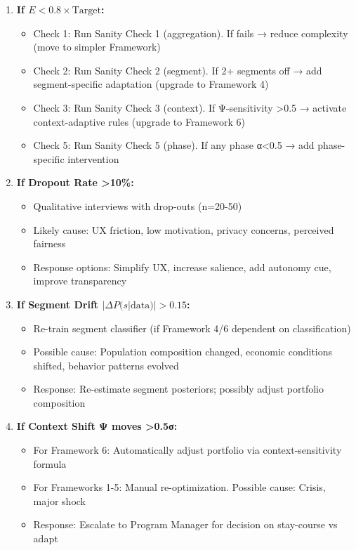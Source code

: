 \begin{definition}

\begin{enumerate}
\item \textbf{If $E < 0.8 \times \text{Target}$:}
  \begin{itemize}[nosep]
  \item Check 1: Run Sanity Check 1 (aggregation). If fails → reduce complexity (move to simpler Framework)
  \item Check 2: Run Sanity Check 2 (segment). If 2+ segments off → add segment-specific adaptation (upgrade to Framework 4)
  \item Check 3: Run Sanity Check 3 (context). If Ψ-sensitivity >0.5 → activate context-adaptive rules (upgrade to Framework 6)
  \item Check 5: Run Sanity Check 5 (phase). If any phase α<0.5 → add phase-specific intervention
  \end{itemize}

\item \textbf{If Dropout Rate >10\%:}
  \begin{itemize}[nosep]
  \item Qualitative interviews with drop-outs (n=20-50)
  \item Likely cause: UX friction, low motivation, privacy concerns, perceived fairness
  \item Response options: Simplify UX, increase salience, add autonomy cue, improve transparency
  \end{itemize}

\item \textbf{If Segment Drift $|\Delta P(s|\text{data})|>0.15$:}
  \begin{itemize}[nosep]
  \item Re-train segment classifier (if Framework 4/6 dependent on classification)
  \item Possible cause: Population composition changed, economic conditions shifted, behavior patterns evolved
  \item Response: Re-estimate segment posteriors; possibly adjust portfolio composition
  \end{itemize}

\item \textbf{If Context Shift Ψ moves >0.5σ:}
  \begin{itemize}[nosep]
  \item For Framework 6: Automatically adjust portfolio via context-sensitivity formula
  \item For Frameworks 1-5: Manual re-optimization. Possible cause: Crisis, major shock
  \item Response: Escalate to Program Manager for decision on stay-course vs adapt
  \end{itemize}

\end{enumerate}

\end{definition}

